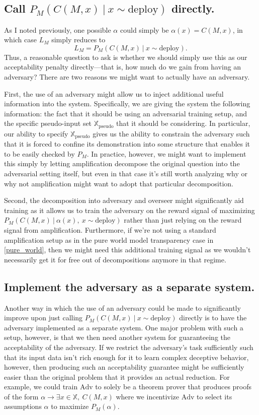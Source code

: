 \documentclass{amsart}
\begin{document}
\subsection{Call $P_M(C(M, x)\ |\ x \sim \text{deploy})$ directly.} As I noted previously, one possible $\alpha$ could simply be $\alpha(x) = C(M, x)$, in which case $L_M$ simply reduces to
\[
    L_M = P_M(C(M, x)\ |\ x \sim \text{deploy}).
\]
Thus, a reasonable question to ask is whether we should simply use this as our acceptability penalty directly---that is, how much do we gain from having an adversary? There are two reasons we might want to actually have an adversary.

First, the use of an adversary might allow us to inject additional useful information into the system. Specifically, we are giving the system the following information: the fact that it should be using an adversarial training setup, and the specific pseudo-input set $\mathbb X_\text{pseudo}$ that it should be considering. In particular, our ability to specify $\mathbb X_\text{pseudo}$ gives us the ability to constrain the adversary such that it is forced to confine its demonstration into some structure that enables it to be easily checked by $P_M$. In practice, however, we might want to implement this simply by letting amplification decompose the original question into the adversarial setting itself, but even in that case it's still worth analyzing why or why not amplification might want to adopt that particular decomposition.

Second, the decomposition into adversary and overseer might significantly aid training as it allows us to train the adversary on the reward signal of maximizing $P_M(C(M, x)\ |\ \alpha(x),~ x \sim \text{deploy})$ rather than just relying on the reward signal from amplification. Furthermore, if we're not using a standard amplification setup as in the pure world model transparency case in \autoref{pure_world}, then we might need this additional training signal as we wouldn't necessarily get it for free out of decompositions anymore in that regime.

\subsection{Implement the adversary as a separate system.} Another way in which the use of an adversary could be made to significantly improve upon just calling $P_M(C(M, x)\ |\ x \sim \text{deploy})$ directly is to have the adversary implemented as a separate system. One major problem with such a setup, however, is that we then need another system for guaranteeing the acceptability of the adversary. If we restrict the adversary's task sufficiently such that its input data isn't rich enough for it to learn complex deceptive behavior, however, then producing such an acceptability guarantee might be sufficiently easier than the original problem that it provides an actual reduction. For example, we could train $\text{Adv}$ to solely be a theorem prover that produces proofs of the form $\alpha \to \exists x \in \mathbb X,~ C(M, x)$ where we incentivize $\text{Adv}$ to select its assumptions $\alpha$ to maximize $P_M(\alpha)$.
\end{document}
